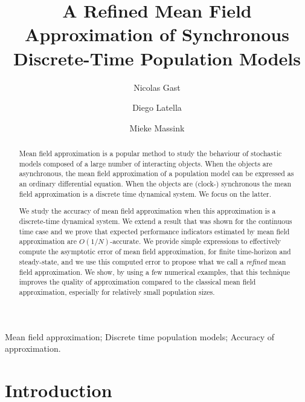 \documentclass[review]{elsarticle}
\begin{document}
\begin{frontmatter}

  \title{A Refined Mean Field Approximation of Synchronous
    Discrete-Time Population Models}

\author[INRIA]{Nicolas Gast}

\author[CNR]{Diego Latella}
\author[CNR]{Mieke Massink}

\address[INRIA]{Inria, Univ. Grenoble Alpes, F-38000 Grenoble, France}
\address[CNR]{CNR-ISTI, I-56124 Pisa, Italy}

\begin{abstract}
  Mean field approximation is a popular method to study the behaviour
  of stochastic models composed of a large number of interacting
  objects. When the objects are asynchronous, the mean field
  approximation of a population model can be expressed as an ordinary
  differential equation. When the objects are (clock-) synchronous the
  mean field approximation is a discrete time dynamical system. We
  focus on the latter.

  We study the accuracy of mean field approximation when this
  approximation is a discrete-time dynamical system. We extend a
  result that was shown for the continuous time case and we prove that
  expected performance indicators estimated by mean field approximation
  are $O(1/N)$-accurate. We provide simple expressions to effectively
  compute the asymptotic error of mean field approximation, for finite
  time-horizon and steady-state, and we use this computed error to
  propose what we call a \emph{refined} mean field approximation. We
  show, by using a few numerical examples, that this technique
  improves the quality of approximation compared to the classical mean
  field approximation, especially for relatively small population sizes.
\end{abstract}

\begin{keyword}
  Mean field approximation; Discrete time population models; Accuracy
  of approximation.
\end{keyword}

\end{frontmatter}

\linenumbers

\section{Introduction}
\label{sect:introduction}
\end{document}
